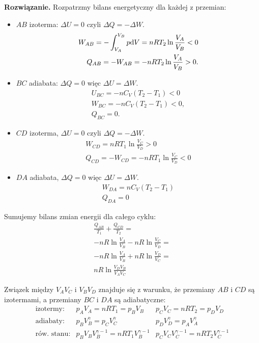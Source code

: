 \documentclass[11pt,a4paper]{article}
\newenvironment{solution}{\vspace{1cm} \par\textbf{Rozwiązanie.} \vspace{1cm}}{}
\begin{document}
\begin{solution}
Rozpatrzmy bilans energetyczny dla każdej z przemian:\\
\begin{itemize}
	\item $AB$ izoterma: $\Delta U = 0$ czyli $\Delta Q = - \Delta W$. 
	\begin{align*}
		W_{AB} = - \int_{V_A}^{V_B} p {\rm d}V =  n R T_2  \ln \frac{V_A}{V_B} < 0 \\
		Q_{AB} = -W_{AB} = - n R T_2 \ln \frac{V_A}{V_B} > 0.
	\end{align*}
	\item $BC$ adiabata: $\Delta Q = 0$ więc $\Delta U = \Delta W$. 
	\begin{align*}
		U_{BC} = - n C_V (T_2 - T_1) < 0 \\
		W_{BC} = - n C_V (T_2 - T_1) < 0, \\ 
    Q_{BC} = 0.
	\end{align*}
	\item $CD$ izoterma, $\Delta U = 0$ czyli $\Delta Q = - \Delta W$.
	\begin{align*}
		W_{CD} =  n R T_1 \ln \frac{V_C}{V_D} > 0 \\
    Q_{CD} = -W_{CD} =  -n RT_1 \ln \frac{V_C}{V_D} < 0
	\end{align*}
	\item $DA$ adiabata, $\Delta Q = 0$ więc $\Delta U = \Delta W$.
	\begin{align*}
		W_{DA} = n C_V (T_2 - T_1) \\
    Q_{DA} = 0
	\end{align*}
\end{itemize}

Sumujemy bilans zmian energii dla całego cyklu:
\begin{align*}
  \frac{Q_{AB}}{T_1} + \frac{Q_{CD}}{T_2} = \\
  - n R \ln \frac{V_A}{V_B} - n R \ln \frac{V_C}{V_D} = \\
  -nR \ln \frac{V_A}{V_B} + n R \ln \frac{V_D}{V_C} = \\
  n R \ln \frac{V_D V_B}{V_A V_C}
\end{align*}

Związek między $V_A V_C$ i $V_B V_D$ znajduje się z warunku, 
że przemiany $AB$ i $CD$ są izotermami, 
a przemiany $BC$ i $DA$ są adiabatyczne:
\begin{align*}
  \text{izotermy}: & p_A V_A = n R T_1 = p_B V_B & p_C V_C = n R T_2 = p_D V_D \\
  \text{adiabaty}: & p_B V_B^{\gamma}= p_C V_C^{\gamma} & p_D V_D^{\gamma} = p_A V_A^{\gamma} \\ 
  \text{rów. stanu}: & p_B V_B V_B^{\gamma-1} = nR T_1 V_B^{\gamma-1} & p_C V_C V_C^{\gamma-1} = nR T_2 V_C^{\gamma-1} \\
\end{align*}


\end{solution}
\end{document}

